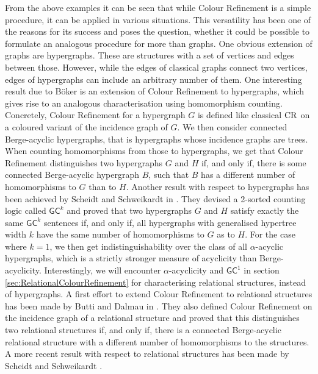 From the above examples it can be seen that while Colour Refinement is a simple procedure, it can be applied in various situations.
This versatility has been one of the reasons for its success and poses the question, whether it could be possible to formulate an analogous procedure for more than graphs.
One obvious extension of graphs are hypergraphs.
These are structures with a set of vertices and edges between those.
However, while the edges of classical graphs connect two vertices, edges of hypergraphs can include an arbitrary number of them.
One interesting result due to Böker \cite{boker2019ColorRefinement} is an extension of Colour Refinement to hypergraphs, which gives rise to an analogous characterisation using homomorphism counting.
Concretely, Colour Refinement for a hypergraph $G$ is defined like classical $\operatorname{CR}$ on a coloured variant of the incidence graph of $G$.
We then consider connected Berge-acyclic hypergraphs, that is hypergraphs whose incidence graphs are trees. 
When counting homomorphisms from those to hypergraphs, we get that Colour Refinement distinguishes two hypergraphs $G$ and $H$ if, and only if, there is some connected Berge-acyclic hypergraph $B$, such that $B$ has a different number of homomorphisms to $G$ than to $H$.
Another result with respect to hypergraphs has been achieved by Scheidt and Schweikardt in \cite{scheidt2023CountingHomomorphisms}.
They devised a 2-sorted counting logic called $\mathsf{GC}^k$ and proved that two hypergraphs $G$ and $H$ satisfy exactly the same $\mathsf{GC}^k$ sentences if, and only if, all hypergraphs with generalised hypertree width $k$ have the same number of homomorphisms to $G$ as to $H$.
For the case where $k=1$, we then get indistinguishability over the class of all $\alpha$-acyclic hypergraphs, which is a strictly stronger measure of acyclicity than Berge-acyclicity.
Interestingly, we will encounter $\alpha$-acyclicity and $\mathsf{GC}^1$ in section \ref{sec:RelationalColourRefinement} for characterising relational structures, instead of hypergraphs.
A first effort to extend Colour Refinement to relational structures has been made by Butti and Dalmau in \cite{butti2021FractionalHomomorphism}.
They also defined Colour Refinement on the incidence graph of a relational structure and proved that this distinguishes two relational structures if, and only if, there is a connected Berge-acyclic relational structure with a different number of homomorphisms to the structures.
A more recent result with respect to relational structures has been made by Scheidt and Schweikardt \cite{scheidt2025ColorRefinement}.

